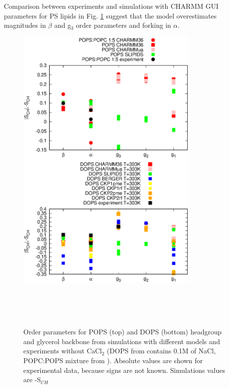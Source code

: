 \documentclass[aps,prl,superscriptaddress,twocolumn]{revtex4}
\begin{document}
Comparison between experiments and simulations with CHARMM GUI
parameters for PS lipids in Fig. \ref{HGorderParametersPOPS} suggest that
the model overestimates magnitudes in $\beta$ and g$_3$ order parameters
and forking in $\alpha$.
\begin{figure}[]
  \centering
  \includegraphics[width=9.0cm]{../Figs/HGorderparametersPOPS.eps}
  \caption{\label{HGorderParametersPOPS}
    Order parameters for POPS (top) and DOPS (bottom) headgroup and glycerol
    backbone from simulations with different models and experiments without CaCl$_2$ 
    (DOPS from \cite{browning80} contains 0.1M of NaCl, POPC:POPS mixture from \cite{roux90}).
    Absolute values are shown for experimental data, because signs are not known.
    Simulations values are -S$_{CH}$
  }
   \\
   \\
   \\
\end{figure}
\end{document}
